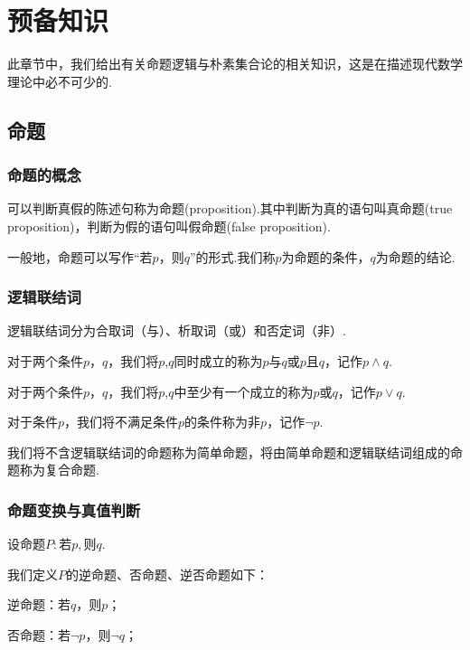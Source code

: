 \chapter*{预备知识}
此章节中，我们给出有关命题逻辑与朴素集合论的相关知识，这是在描述现代数学理论中必不可少的.
\section{命题}
\subsection{命题的概念}
\begin{definition}[命题]
	可以判断真假的陈述句称为{\heiti 命题}(proposition).其中判断为真的语句叫{\heiti 真命题}(true proposition)，判断为假的语句叫{\heiti 假命题}(false proposition).
\end{definition}
一般地，命题可以写作“若$p$，则$q$”的形式.我们称$p$为命题的条件，$q$为命题的结论.
\subsection{逻辑联结词}
逻辑联结词分为合取词（与）、析取词（或）和否定词（非）.
\begin{definition}[与]
	对于两个条件$p$，$q$，我们将$p$,$q$同时成立的称为$p${\heiti 与}$q$或$p${\heiti 且}$q$，记作$p\wedge q$.
\end{definition}

\begin{definition}[或]
	对于两个条件$p$，$q$，我们将$p$,$q$中至少有一个成立的称为$p${\heiti 或}$q$，记作$p\vee q$.
\end{definition}

\begin{definition}[非]
	对于条件$p$，我们将不满足条件$p$的条件称为{\heiti 非}$p$，记作$\neg p$.
\end{definition}

我们将不含逻辑联结词的命题称为{\heiti 简单命题}，将由简单命题和逻辑联结词组成的命题称为{\heiti 复合命题}.
\subsection{命题变换与真值判断}
设命题$P:\text{若}p,\text{则}q$.

我们定义$P$的逆命题、否命题、逆否命题如下：

逆命题：若$q$，则$p$；

否命题：若$\neg p$，则$\neg q$；


